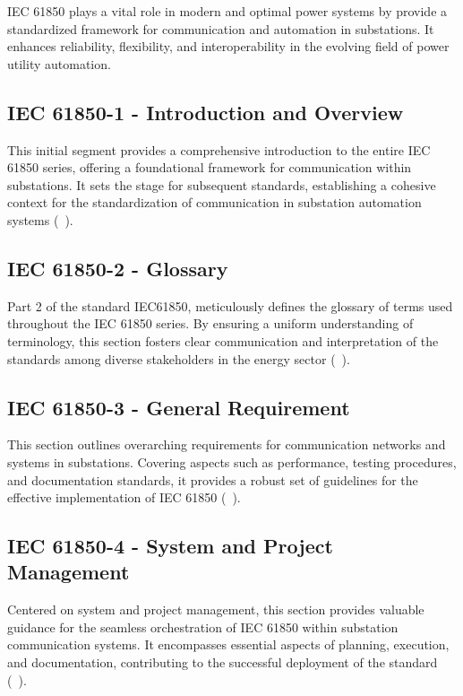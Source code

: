 IEC 61850 plays a vital role in modern and optimal power systems by provide a standardized framework for communication and automation in substations. It enhances reliability, flexibility, and interoperability in the evolving field of power utility automation.

\subsection{IEC 61850-1 - Introduction and Overview}

This initial segment provides a comprehensive introduction to the entire IEC 61850 series, offering a foundational framework for communication within substations. It sets the stage for subsequent standards, establishing a cohesive context for the standardization of communication in substation automation systems (~\cite{Overview_of_IEC_61850_and_Benefits}).

\subsection{IEC 61850-2 - Glossary}

Part 2 of the standard IEC61850, meticulously defines the glossary of terms used throughout the IEC 61850 series. By ensuring a uniform understanding of terminology, this section fosters clear communication and interpretation of the standards among diverse stakeholders in the energy sector (~\cite{Overview_of_IEC_61850_and_Benefits}).

\subsection{IEC 61850-3 - General Requirement}

This section outlines overarching requirements for communication networks and systems in substations. Covering aspects such as performance, testing procedures, and documentation standards, it provides a robust set of guidelines for the effective implementation of IEC 61850 (~\cite{Overview_of_IEC_61850_and_Benefits}).

\subsection{IEC 61850-4 - System and Project Management}

Centered on system and project management, this section provides valuable guidance for the seamless orchestration of IEC 61850 within substation communication systems. It encompasses essential aspects of planning, execution, and documentation, contributing to the successful deployment of the standard (~\cite{Overview_of_IEC_61850_and_Benefits}).

